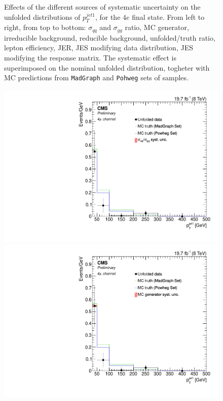 \begin{figure}[hbtp]
\begin{center}
   \caption{Effects of the different sources of systematic uncertainty on the unfolded distributions of  $p_{T}^{jet1}$, for the     
   $4e$ final state. From left to right, from top to bottom: $\sigma_{qq}$ and $\sigma_{gg}$ ratio, MC generator, irreducible background, reducible background, unfolded/truth ratio, lepton efficiency, JER, JES modifying data distribution, JES modifying the response matrix. The systematic effect is superimposed on the nominal unfolded distribution, togheter with MC predictions from \texttt{MadGraph} and \texttt{Pohweg} sets of samples.}
   \label{fig:PtJet1_syst_4e}
 \end{center}
\end{figure}

\begin{figure}[hbtp]
 \begin{center}
   \includegraphics[width=0.8\cmsFigWidth]{Figures/Unfolding/Systematics/ZZTo4m_PtJet1_qqgg_Mad_fr}     
   \includegraphics[width=0.8\cmsFigWidth]{Figures/Unfolding/Systematics/ZZTo4m_PtJet1_MCgen_Mad_fr}     

\end{center}
\end{figure}
